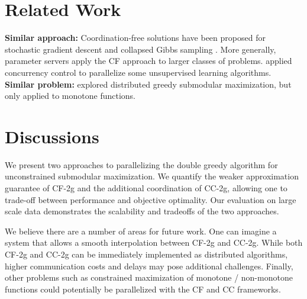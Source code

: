 \documentclass{article} %
\newcommand{\hogwild}{CF-2g}
\newcommand{\occ}{CC-2g}
\newcommand{\hogwildshort}{CF}
\newcommand{\occshort}{CC}
\begin{document}
\section{Related Work \label{sec:related}}
\textbf{Similar approach: }
Coordination-free solutions have been proposed for stochastic gradient descent \cite{Recht11} and collapsed Gibbs sampling \cite{Ahmed12}.
More generally, parameter servers \cite{li2013, ho2013} apply the \hogwildshort{} approach to larger classes of problems.
\cite{pan2013} applied concurrency control to parallelize some unsupervised learning algorithms.
\textbf{Similar problem: } \cite{Mirzasoleiman2013} explored distributed greedy submodular maximization, but only applied to monotone functions.






\section{Discussions \label{sec:discussions}}

We present two approaches to parallelizing the double greedy algorithm for unconstrained submodular maximization.
We quantify the weaker approximation guarantee of \hogwild{} and the additional coordination of \occ{}, allowing one to trade-off between performance and objective optimality.
Our evaluation on large scale data demonstrates the scalability and tradeoffs of the two approaches.

We believe there are a number of areas for future work.
One can imagine a system that allows a smooth interpolation between \hogwild{} and \occ{}.
While both \hogwild{} and \occ{} can be immediately implemented as distributed algorithms, higher communication costs and delays may pose additional challenges.
Finally, other problems such as constrained maximization of monotone / non-monotone functions could potentially be parallelized with the \hogwildshort{} and \occshort{} frameworks.

\newpage
{\footnotesize




}
\end{document}
